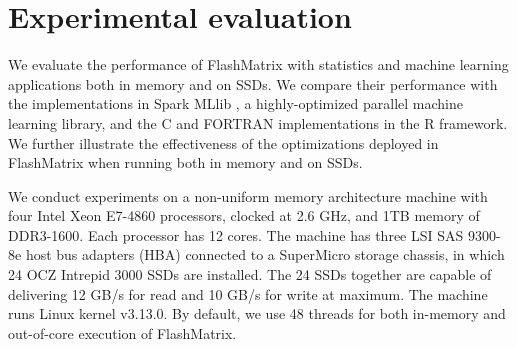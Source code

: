 \section{Experimental evaluation}
We evaluate the performance of FlashMatrix with statistics and machine learning
applications both in memory and on SSDs. We compare their performance with
the implementations in Spark MLlib \cite{mllib}, a highly-optimized parallel
machine learning library, and the C and FORTRAN implementations in the R framework.
We further illustrate the effectiveness of the optimizations deployed in
FlashMatrix when running both in memory and on SSDs.

We conduct experiments on a non-uniform memory architecture machine with
four Intel Xeon E7-4860 processors, clocked at 2.6 GHz, and 1TB memory of
DDR3-1600. Each processor has 12 cores. The machine has three LSI SAS 9300-8e
host bus adapters (HBA) connected to a SuperMicro storage chassis, in which
24 OCZ Intrepid 3000 SSDs are installed. The 24 SSDs together are capable of
delivering 12 GB/s for read and 10 GB/s for write at maximum. The machine runs
Linux kernel v3.13.0. By default, we use 48 threads for both in-memory and
out-of-core execution of FlashMatrix.

